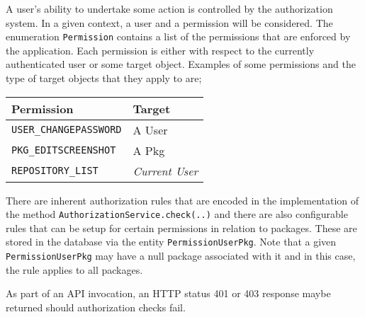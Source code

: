 A user's ability to undertake some action is controlled by the authorization system.  In a given context, a user and a permission will be considered.  The enumeration {\tt Permission} contains a list of the permissions that are enforced by the application.  Each permission is either with respect to the currently authenticated user or some target object.  Examples of some permissions and the type of target objects that they apply to are;

\begin{tabular}{ | l | l | }
\hline
Permission & Target \\
\hline
{\tt USER\_CHANGEPASSWORD} & A User \\
{\tt PKG\_EDITSCREENSHOT} & A Pkg \\
{\tt REPOSITORY\_LIST} & {\it Current User} \\
\hline
\end{tabular}

There are inherent authorization rules that are encoded in the implementation of the method {\tt AuthorizationService.check(..)} and there are also configurable rules that can be setup for certain permissions in relation to packages.  These are stored in the database via the entity {\tt PermissionUserPkg}.  Note that a given {\tt PermissionUserPkg} may have a null package associated with it and in this case, the rule applies to all packages.

As part of an API invocation, an HTTP status 401 or 403 response maybe returned should authorization checks fail.
